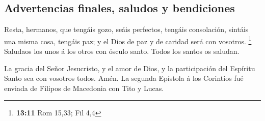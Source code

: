 \hypertarget{advertencias-finales-saludos-y-bendiciones}{%
\subsection{Advertencias finales, saludos y
bendiciones}\label{advertencias-finales-saludos-y-bendiciones}}

 Resta, hermanos, que tengáis gozo, seáis perfectos,
tengáis consolación, sintáis una misma cosa, tengáis paz; y el Dios de
paz y de caridad será con vosotros. \footnote{\textbf{13:11} Rom 15,33;
  Fil 4,4}  Saludaos los unos á los otros con ósculo santo.
Todos los santos os saludan.

 La gracia del Señor Jesucristo, y el amor de Dios, y la
participación del Espíritu Santo sea con vosotros todos. Amén. La
segunda Epístola á los Corintios fué enviada de Filipos de Macedonia con
Tito y Lucas. 
